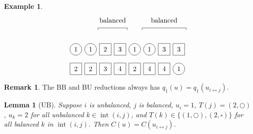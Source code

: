 \documentclass[submission]{FPSAC2018}
\DeclareMathOperator{\inter}{int} %
\theoremstyle{plain}
\newtheorem{lemma}[thm]{Lemma}
\theoremstyle{definition}
\newtheorem{example}[thm]{Example}
\newtheorem{remark}[thm]{Remark}
\numberwithin{equation}{section}
\begin{document}
\begin{example}
\[\begin{tikzpicture}[baseline=25]
  \foreach \i in {1,2,5,6} { \draw (\i*\sc,\ll) circle (0.3); }
  \foreach \i in {3,4,7,8} { \draw (\i*\sc-.3,\ll-.3) rectangle +(0.6,+0.6); }
  \foreach \i in {1,2,5,6} { \node at (\i*\sc,\ll) {$1$}; }
  \foreach \i in {3} { \node at (\i*\sc,\ll) {$2$}; }
  \foreach \i in {4,7,8} { \node at (\i*\sc,\ll) {$3$}; }
  \foreach \i in {8} { \draw (\i*\sc,\l) circle (0.3); }
  \foreach \i in {1,2,3,4,5,6,7} { \draw (\i*\sc-.3,\l-.3) rectangle +(0.6,+0.6); }
  \foreach \i in {4,6,7} { \node at (\i*\sc,\l) {$4$}; }
  \foreach \i in {8} { \node at (\i*\sc,\l) {$1$}; }
  \foreach \i in {3} { \node at (\i*\sc,\l) {$3$}; }
  \foreach \i in {1,2,5} { \node at (\i*\sc,\l) {$2$}; }
  \draw (2.5*\sc,3) -- (2.5*\sc,3.1) -- (4.5*\sc,3.1) -- (4.5*\sc,3);
  \node at (3.5*\sc,3.5) {balanced};
  \draw (5.5*\sc,3) -- (5.5*\sc,3.1) -- (8.5*\sc,3.1) -- (8.5*\sc,3);
  \node at (7.0*\sc,3.5) {balanced};
\end{tikzpicture}
\]
\end{example}

\begin{remark}
The BB and BU reductions always has $q_1(u) = q_1(u_{i \leftrightarrow j})$.
\end{remark}

\begin{lemma}[UB]
\label{le:UB}
  Suppose $i$ is unbalanced, $j$ is balanced, $u_i = 1$, $T(j) = (2,\bigcirc)$, $u_k = 2$ for all unbalanced $k \in \inter(i,j)$, and $T(k) \in \{(1,\bigcirc),(2,\square)\}$ for all balanced $k$ in $\inter(i,j)$.
  Then $C(u) = C(u_{i \leftrightarrow j})$.
\end{lemma}
\end{document}

